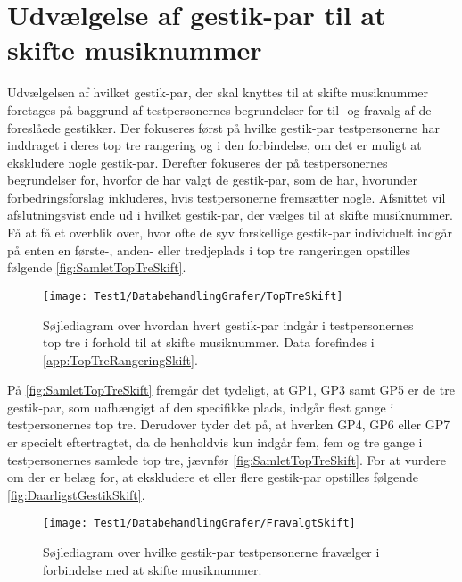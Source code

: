 \section{Udvælgelse af gestik-par til at skifte musiknummer}
\label{TestresultaterSkiftMusiknummer}
%
Udvælgelsen af hvilket gestik-par, der skal knyttes til at skifte musiknummer foretages på baggrund af testpersonernes begrundelser for til- og fravalg af de foreslåede gestikker. Der fokuseres først på hvilke gestik-par testpersonerne har inddraget i deres top tre rangering og i den forbindelse, om det er muligt at ekskludere nogle gestik-par. Derefter fokuseres der på testpersonernes begrundelser for, hvorfor de har valgt de gestik-par, som de har, hvorunder forbedringsforslag inkluderes, hvis testpersonerne fremsætter nogle. Afsnittet vil afslutningsvist ende ud i hvilket gestik-par, der vælges til at skifte musiknummer.\blankline
%
Få at få et overblik over, hvor ofte de syv forskellige gestik-par individuelt indgår på enten en første-, anden- eller tredjeplads i top tre rangeringen opstilles følgende \autoref{fig:SamletTopTreSkift}. 
%
\begin{figure}[H]
	\centering
	\texttt{[image: Test1/DatabehandlingGrafer/TopTreSkift]}
	\caption{Søjlediagram over hvordan hvert gestik-par indgår i testpersonernes top tre i forhold til at skifte musiknummer. Data forefindes i \autoref{app:TopTreRangeringSkift}.}
	\label{fig:SamletTopTreSkift}
\end{figure}
\noindent
%
På \autoref{fig:SamletTopTreSkift} fremgår det tydeligt, at GP1, GP3 samt GP5 er de tre gestik-par, som uafhængigt af den specifikke plads, indgår flest gange i testpersonernes top tre. Derudover tyder det på, at hverken GP4, GP6 eller GP7 er specielt eftertragtet, da de henholdvis kun indgår fem, fem og tre gange i testpersonernes samlede top tre, jævnfør \autoref{fig:SamletTopTreSkift}. For at vurdere om der er belæg for, at ekskludere et eller flere gestik-par opstilles følgende \autoref{fig:DaarligstGestikSkift}. 
%
\begin{figure}[H]
	\centering
	\texttt{[image: Test1/DatabehandlingGrafer/FravalgtSkift]}
	\caption{Søjlediagram over hvilke gestik-par testpersonerne fravælger i forbindelse med at skifte musiknummer.}
	\label{fig:DaarligstGestikSkift}
\end{figure}
\noindent
%
